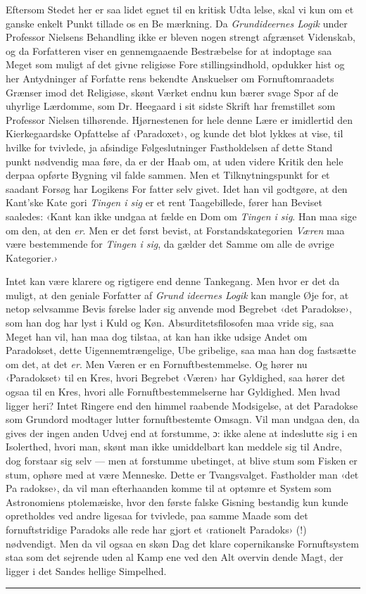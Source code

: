 \documentclass[12pt,a4paper,openany]{book}
\newcommand{\piecerule}{\par\begin{center}\rule{1.5cm}{0.4pt}\end{center}\par}
\newcommand{\opage}[1]{\marginnote{\footnotesize\textit{[#1]}}}
\begin{document}
\opage{41}Eftersom Stedet her er saa lidet egnet til en kritisk Udta\-%
lelse, skal vi kun om et ganske enkelt Punkt tillade os en Be\-%
mærkning. Da \emph{Grundideernes Logik} under Professor Nielsens
Behandling ikke er bleven nogen strengt afgrænset Videnskab,
og da Forfatteren viser en gennemgaaende Bestræbelse for at
indoptage saa Meget som muligt af det givne religiøse Fore\-%
stillingsindhold, opdukker hist og her Antydninger af Forfatte\-%
rens bekendte Anskuelser om Fornuftomraadets Grænser imod det
Religiøse, skønt Værket endnu kun bærer svage Spor af de
uhyrlige Lærdomme, som Dr. Heegaard i sit sidste Skrift har
fremstillet som Professor Nielsen tilhørende. Hjørnestenen for
hele denne Lære er imidlertid den Kierkegaardske Opfattelse af
‹Paradoxet›, og kunde det blot lykkes at vise, til hvilke for\-%
tvivlede, ja afsindige Følgeslutninger Fastholdelsen af dette Stand\-%
punkt nødvendig maa føre, da er der Haab om, at uden videre
Kritik den hele derpaa opførte Bygning vil falde sammen. Men
et Tilknytningspunkt for et saadant Forsøg har Logikens For\-%
fatter selv givet. Idet han vil godtgøre, at den Kant'ske Kate\-%
gori \emph{Tingen i sig} er et rent Taagebillede, fører han Beviset
saaledes: ‹Kant kan ikke undgaa at fælde en Dom om \emph{Tingen
i sig}. Han maa sige om den, at den \emph{er}. Men er det først
bevist, at Forstandskategorien \emph{Væren} maa være bestemmende
for \emph{Tingen i sig}, da gælder det Samme om alle de øvrige
Kategorier.›

Intet kan være klarere og rigtigere end denne Tankegang.
Men hvor er det da muligt, at den geniale Forfatter af \emph{Grund\-%
ideernes Logik} kan mangle Øje for, at netop selvsamme Bevis\-%
førelse lader sig anvende mod Begrebet ‹det Paradokse›, som
han dog har lyst i Kuld og Køn. Absurditetsfilosofen maa vride
sig, saa Meget han vil, han maa dog tilstaa, at kan han ikke
udsige Andet om Paradokset, dette Uigennemtrængelige, Ube\-%
gribelige, saa maa han dog fastsætte om det, at det \emph{er}. Men
Væren er en Fornuftbestemmelse. Og hører nu ‹Paradokset› til
en Kres, hvori Begrebet ‹Væren› har Gyldighed, saa hører
det ogsaa til en Kres, hvori alle Fornuftbestemmelserne har
Gyldighed. Men hvad ligger heri? Intet Ringere end den himmel\-%
raabende Modsigelse, at det Paradokse som Grundord modtager
lutter fornuftbestemte Omsagn. Vil man undgaa den, da gives der
ingen anden Udvej end at forstumme, ɔ: ikke alene at indeslutte
sig i en Isolerthed, hvori man, skønt man ikke umiddelbart kan
\opage{42}meddele sig til Andre, dog forstaar sig selv --- men at forstumme
ubetinget, at blive stum som Fisken er stum, ophøre med at
være Menneske. Dette er Tvangsvalget. Fastholder man ‹det Pa\-%
radokse›, da vil man efterhaanden komme til at optømre et
System som Astronomiens ptolemæiske, hvor den første falske
Gisning bestandig kun kunde opretholdes ved andre ligesaa for\-%
tvivlede, paa samme Maade som det fornuftstridige Paradoks alle\-%
rede har gjort et ‹rationelt Paradoks› (!) nødvendigt. Men da
vil ogsaa en skøn Dag det klare copernikanske Fornuftsystem
staa som det sejrende uden al Kamp ene ved den Alt overvin\-%
dende Magt, der ligger i det Sandes hellige Simpelhed.
\piecerule
\end{document}
